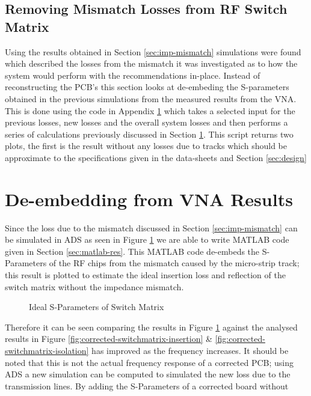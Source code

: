 \documentclass[12pt,openany,a4paper]{book}
\begin{document}
\subsection{Removing Mismatch Losses from RF Switch Matrix}
Using the results obtained in Section \ref{sec:imp-mismatch} simulations were found which described the losses from the mismatch it was investigated as to how the system would perform with the recommendations in-place. Instead of reconstructing the PCB's this section looks at de-embeding the S-parameters obtained in the previous simulations from the measured results from the VNA. This is done using the code in Appendix \ref{} which takes a selected input for the previous losses, new losses and the overall system losses and then performs a series of calculations previously discussed in Section \ref{}. %
This script returns two plots, the first is the result without any losses due to tracks which should be approximate to the specifications given in the data-sheets and Section \ref{sec:design}





\section{De-embedding from VNA Results}
Since the loss due to the mismatch discussed in Section \ref{sec:imp-mismatch} can be simulated in ADS as seen in Figure \ref{} we are able to write MATLAB code given in Section \ref{sec:matlab-res}. This MATLAB code de-embeds the S-Parameters of the RF chips from the mismatch caused by the micro-strip track; this result is plotted to estimate the ideal insertion loss and reflection of the switch matrix without the impedance mismatch. 
\begin{figure}[H]
	\centering
	\caption{Ideal S-Parameters of Switch Matrix}
	\label{fig:ideal-switchmatrix}
\end{figure} 
Therefore it can be seen comparing the results in Figure \ref{fig:ideal-switchmatrix} against the analysed results in Figure \ref{fig:corrected-switchmatrix-insertion} \& \ref{fig:corrected-switchmatrix-isolation} has improved as the frequency increases. It should be noted that this is not the actual frequency response of a corrected PCB; using ADS a new simulation can be computed to simulated the new loss due to the transmission lines. By adding the S-Parameters 
 of a corrected board without 
 
\end{document}
